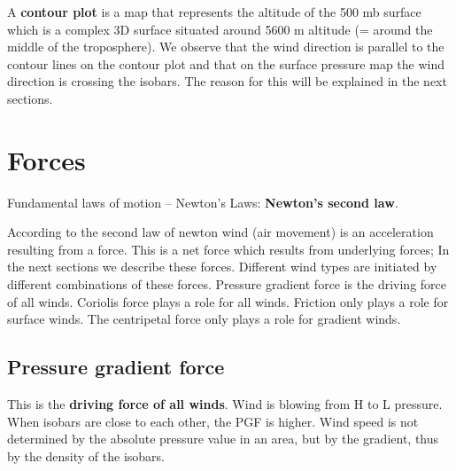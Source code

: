 \documentclass[12pt,oneside]{book}
\begin{document}
A \textbf{contour plot} is a map that represents the altitude of the 500
mb surface which is a complex 3D surface situated around 5600 m altitude
(= around the middle of the troposphere). We observe that the wind
direction is parallel to the contour lines on the contour plot and that
on the surface pressure map the wind direction is crossing the isobars.
The reason for this will be explained in the next sections.

\section{Forces}\label{forces}

Fundamental laws of motion -- Newton's Laws: \textbf{Newton's second
law}.

According to the second law of newton wind (air movement) is an
acceleration resulting from a force. This is a net force which results
from underlying forces; In the next sections we describe these forces.
Different wind types are initiated by different combinations of these
forces. Pressure gradient force is the driving force of all winds.
Coriolis force plays a role for all winds. Friction only plays a role
for surface winds. The centripetal force only plays a role for gradient
winds.

\subsection{Pressure gradient force}\label{pressure-gradient-force}

This is the \textbf{driving force of all winds}. Wind is blowing from H
to L pressure. When isobars are close to each other, the PGF is higher.
Wind speed is not determined by the absolute pressure value in an area,
but by the gradient, thus by the density of the isobars.
\end{document}
